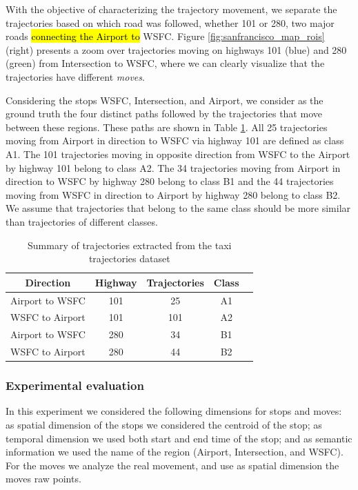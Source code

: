 \documentclass[12pt]{article}
\begin{document}
With the objective of characterizing the trajectory movement, we separate the trajectories based on which road was followed, whether 101 or 280, two major roads \hl{connecting the Airport to} WSFC. {Figure \ref{fig:sanfrancisco_map_rois}} (right) presents a zoom over trajectories moving on highways 101 (blue) and 280 (green) from Intersection to WSFC, where we can clearly visualize that the trajectories have different \emph{moves}.

Considering the stops WSFC, Intersection, and Airport, we consider as the ground truth the four distinct paths followed by the trajectories that move between these regions. These paths are shown in Table \ref{tab:san_francisco_dataset}. All 25 trajectories moving from Airport in direction to WSFC via highway 101 are defined as class A1. The 101 trajectories moving in opposite direction from WSFC to the Airport by highway 101 belong to class A2. The 34 trajectories moving from Airport in direction to WSFC by highway 280 belong to class B1 and the 44 trajectories moving from WSFC in direction to Airport by highway 280 belong to class B2. We assume that trajectories that belong to the same class should be more similar than trajectories of different classes.

\begin{table}[h]
\scriptsize
  \centering
  \begin{tabular}{|c|c|c|c|c|}
  	\hline
 Direction & Highway & Trajectories & Class \\
  	\hline
 Airport to WSFC & 101 & 25 & A1\\
 WSFC to Airport & 101 & 101 & A2\\
 Airport to WSFC & 280 & 34 & B1\\
 WSFC to Airport & 280 & 44 & B2\\
    \hline
  \end{tabular}
  \caption{Summary of trajectories extracted from the taxi trajectories dataset}
  \label{tab:san_francisco_dataset}
\end{table}

\subsubsection{Experimental evaluation}

In this experiment we considered the following dimensions for stops and moves: as spatial dimension of the stops we considered the centroid of the stop; as temporal dimension we used both start and end time of the stop; and as semantic information we used the name of the region (Airport, Intersection, and WSFC). For the moves we analyze the real movement, and use as spatial dimension the moves raw points.
\end{document}
